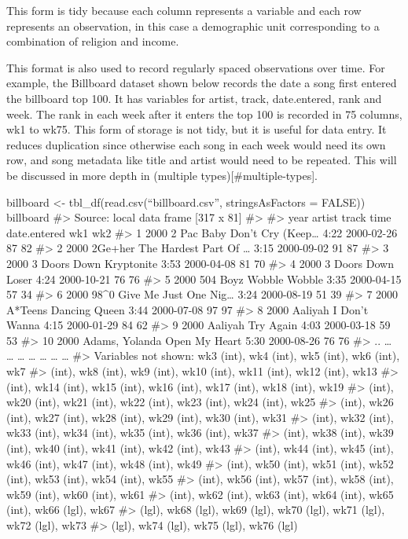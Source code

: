 \documentclass[]{article}
\begin{document}
This form is tidy because each column represents a variable and each row
represents an observation, in this case a demographic unit corresponding
to a combination of religion and income.

This format is also used to record regularly spaced observations over
time. For example, the Billboard dataset shown below records the date a
song first entered the billboard top 100. It has variables for artist,
track, date.entered, rank and week. The rank in each week after it
enters the top 100 is recorded in 75 columns, wk1 to wk75. This form of
storage is not tidy, but it is useful for data entry. It reduces
duplication since otherwise each song in each week would need its own
row, and song metadata like title and artist would need to be repeated.
This will be discussed in more depth in (multiple
types){[}\#multiple-types{]}.

billboard \textless{}- tbl\_df(read.csv(``billboard.csv'',
stringsAsFactors = FALSE)) billboard \#\textgreater{} Source: local data
frame {[}317 x 81{]} \#\textgreater{} \#\textgreater{} year artist track
time date.entered wk1 wk2 \#\textgreater{} 1 2000 2 Pac Baby Don't Cry
(Keep\ldots{} 4:22 2000-02-26 87 82 \#\textgreater{} 2 2000 2Ge+her The
Hardest Part Of \ldots{} 3:15 2000-09-02 91 87 \#\textgreater{} 3 2000 3
Doors Down Kryptonite 3:53 2000-04-08 81 70 \#\textgreater{} 4 2000 3
Doors Down Loser 4:24 2000-10-21 76 76 \#\textgreater{} 5 2000 504 Boyz
Wobble Wobble 3:35 2000-04-15 57 34 \#\textgreater{} 6 2000 98\^{}0 Give
Me Just One Nig\ldots{} 3:24 2000-08-19 51 39 \#\textgreater{} 7 2000
A*Teens Dancing Queen 3:44 2000-07-08 97 97 \#\textgreater{} 8 2000
Aaliyah I Don't Wanna 4:15 2000-01-29 84 62 \#\textgreater{} 9 2000
Aaliyah Try Again 4:03 2000-03-18 59 53 \#\textgreater{} 10 2000 Adams,
Yolanda Open My Heart 5:30 2000-08-26 76 76 \#\textgreater{} .. \ldots{}
\ldots{} \ldots{} \ldots{} \ldots{} \ldots{} \ldots{} \#\textgreater{}
Variables not shown: wk3 (int), wk4 (int), wk5 (int), wk6 (int), wk7
\#\textgreater{} (int), wk8 (int), wk9 (int), wk10 (int), wk11 (int),
wk12 (int), wk13 \#\textgreater{} (int), wk14 (int), wk15 (int), wk16
(int), wk17 (int), wk18 (int), wk19 \#\textgreater{} (int), wk20 (int),
wk21 (int), wk22 (int), wk23 (int), wk24 (int), wk25 \#\textgreater{}
(int), wk26 (int), wk27 (int), wk28 (int), wk29 (int), wk30 (int), wk31
\#\textgreater{} (int), wk32 (int), wk33 (int), wk34 (int), wk35 (int),
wk36 (int), wk37 \#\textgreater{} (int), wk38 (int), wk39 (int), wk40
(int), wk41 (int), wk42 (int), wk43 \#\textgreater{} (int), wk44 (int),
wk45 (int), wk46 (int), wk47 (int), wk48 (int), wk49 \#\textgreater{}
(int), wk50 (int), wk51 (int), wk52 (int), wk53 (int), wk54 (int), wk55
\#\textgreater{} (int), wk56 (int), wk57 (int), wk58 (int), wk59 (int),
wk60 (int), wk61 \#\textgreater{} (int), wk62 (int), wk63 (int), wk64
(int), wk65 (int), wk66 (lgl), wk67 \#\textgreater{} (lgl), wk68 (lgl),
wk69 (lgl), wk70 (lgl), wk71 (lgl), wk72 (lgl), wk73 \#\textgreater{}
(lgl), wk74 (lgl), wk75 (lgl), wk76 (lgl)
\end{document}
